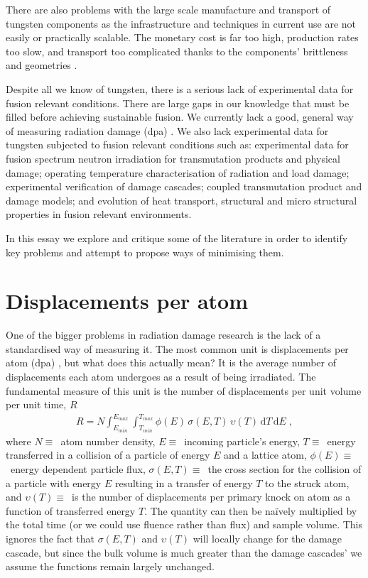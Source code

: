 \documentclass[12pt, a4paper]{article}
\begin{document}
		There are also problems with the large scale manufacture and transport of tungsten components as the infrastructure and techniques in current use are not easily or practically scalable. The monetary cost is far too high, production rates too slow, and transport too complicated thanks to the components' brittleness and geometries \cite{manufacture}.
		
		Despite all we know of tungsten, there is a serious lack of experimental data for fusion relevant conditions. There are large gaps in our knowledge that must be filled before achieving sustainable fusion. We currently lack a good, general way of measuring radiation damage (dpa) \cite{srimisbad}. We also lack experimental data for tungsten subjected to fusion relevant conditions \cite{ifmif} such as: experimental data for fusion spectrum neutron irradiation for transmutation products and physical damage; operating temperature characterisation of radiation and load damage; experimental verification of damage cascades; coupled transmutation product and damage models; and evolution of heat transport, structural and micro structural properties in fusion relevant environments.
		
		In this essay we explore and critique some of the literature in order to identify key problems and attempt to propose ways of minimising them.
	\section{Displacements per atom}\label{s:dpa}
		One of the bigger problems in radiation damage research is the lack of a standardised way of measuring it. The most common unit is displacements per atom (dpa) \cite{dpa}, but what does this actually mean? It is the average number of displacements each atom undergoes as a result of being irradiated. The fundamental measure of this unit is the number of displacements per unit volume per unit time, $R$
		\begin{align}
			R=N\int _{E_{min}}^{E_{max}}\int _{T_{min}}^{T_{max}}\phi (E)\,\sigma (E,T)\,\upsilon (T)\,\mathrm{d}T\,\mathrm{d}E\;,
		\end{align}
		where $N \equiv$~atom number density, $E \equiv$~incoming particle's energy, $T \equiv$~energy transferred in a collision of a particle of energy $E$ and a lattice atom, $\phi (E) \equiv$~energy dependent particle flux, $\sigma (E,T) \equiv$~the cross section for the collision of a particle with energy $E$ resulting in a transfer of energy $T$ to the struck atom, and $\upsilon (T) \equiv$~is the number of displacements per primary knock on atom as a function of transferred energy $T$. The quantity can then be na\"{i}vely multiplied by the total time (or we could use fluence rather than flux) and sample volume. This ignores the fact that $\sigma (E,T)$ and $\upsilon (T)$ will locally change for the damage cascade, but since the bulk volume is much greater than the damage cascades' we assume the functions remain largely unchanged.
		
\end{document}
